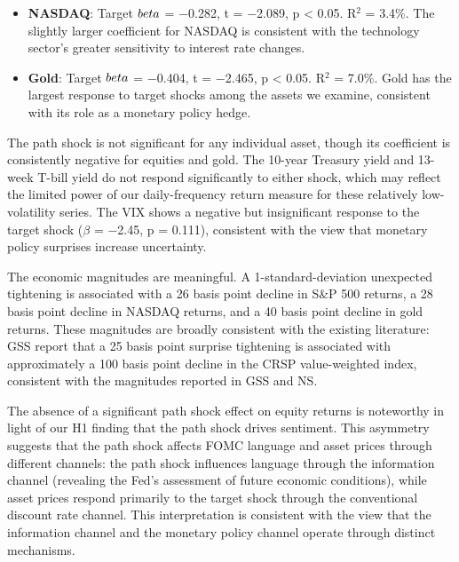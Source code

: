 \documentclass[12pt]{article}
\begin{document}
\begin{itemize}
\item \textbf{NASDAQ}: Target $\\beta$ = $-$0.282, t = $-$2.089, p < 0.05. R$^2$ = 3.4\%. The slightly larger coefficient for NASDAQ is consistent with the technology sector's greater sensitivity to interest rate changes.
\end{itemize}

\begin{itemize}
\item \textbf{Gold}: Target $\\beta$ = $-$0.404, t = $-$2.465, p < 0.05. R$^2$ = 7.0\%. Gold has the largest response to target shocks among the assets we examine, consistent with its role as a monetary policy hedge.
\end{itemize}

The path shock is not significant for any individual asset, though its coefficient is consistently negative for equities and gold. The 10-year Treasury yield and 13-week T-bill yield do not respond significantly to either shock, which may reflect the limited power of our daily-frequency return measure for these relatively low-volatility series. The VIX shows a negative but insignificant response to the target shock ($\beta$ = $-$2.45, p = 0.111), consistent with the view that monetary policy surprises increase uncertainty.

The economic magnitudes are meaningful. A 1-standard-deviation unexpected tightening is associated with a 26 basis point decline in S\&P 500 returns, a 28 basis point decline in NASDAQ returns, and a 40 basis point decline in gold returns. These magnitudes are broadly consistent with the existing literature: GSS report that a 25 basis point surprise tightening is associated with approximately a 100 basis point decline in the CRSP value-weighted index, consistent with the magnitudes reported in GSS and NS.

The absence of a significant path shock effect on equity returns is noteworthy in light of our H1 finding that the path shock drives sentiment. This asymmetry suggests that the path shock affects FOMC language and asset prices through different channels: the path shock influences language through the information channel (revealing the Fed's assessment of future economic conditions), while asset prices respond primarily to the target shock through the conventional discount rate channel. This interpretation is consistent with the view that the information channel and the monetary policy channel operate through distinct mechanisms.
\end{document}

